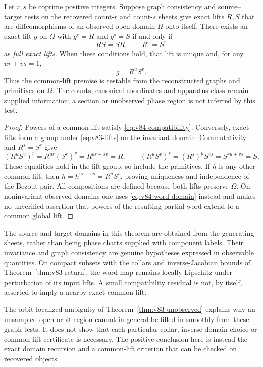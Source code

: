 \begin{theorem}
\label{thm:v84-compatible}
Let $r,s$ be coprime positive integers. Suppose graph consistency and
source--target tests on the recovered count-$r$ and count-$s$ sheets
give exact lifts $R,S$ that are diffeomorphisms of an observed open
domain $\Omega$ onto itself. There exists an exact lift $g$ on $\Omega$
with $g^r=R$ and $g^s=S$ if and only if
\begin{equation}\label{eq:v84-compatibility}
                         RS=SR,\qquad R^s=S^r
\end{equation}
as \emph{full exact lifts}. When these conditions hold, that lift is
unique and, for any $ur+vs=1$,
\[
                              g=R^uS^v.
\]
Thus the common-lift premise is testable from the reconstructed graphs
and primitives on $\Omega$. The counts, canonical coordinates and
apparatus class remain supplied information; a section or unobserved
phase region is not inferred by this test.
\end{theorem}
\begin{proof}
Powers of a common lift satisfy \eqref{eq:v84-compatibility}. Conversely,
exact lifts form a group under \eqref{eq:v83-lifts} on the invariant
domain. Commutativity and $R^s=S^r$ give
\[
 (R^uS^v)^r=R^{ur}(S^r)^v=R^{ur+sv}=R,
 \qquad
 (R^uS^v)^s=(R^s)^uS^{vs}=S^{ru+vs}=S.
\]
These equalities hold in the lift group, so include the primitives.
If $h$ is any other common lift, then
$h=h^{ur+vs}=R^uS^v$, proving uniqueness and independence of the
Bezout pair. All compositions are defined because both lifts preserve
$\Omega$. On noninvariant observed domains one uses
\eqref{eq:v84-word-domain} instead and makes no unverified assertion
that powers of the resulting partial word extend to a common global
lift.
\end{proof}
The source and target domains in this theorem are obtained from the
generating sheets, rather than being phase charts supplied with
component labels. Their invariance and graph consistency are genuine
hypotheses expressed in observable quantities. On compact subsets
with the collars and inverse-Jacobian bounds of
Theorem~\ref{thm:v83-return}, the word map remains locally Lipschitz
under perturbation of its input lifts. A small compatibility residual
is not, by itself, asserted to imply a nearby exact common lift.

The orbit-localized ambiguity of Theorem~\ref{thm:v83-unobserved}
explains why an unsampled open orbit region cannot in general be
filled in smoothly from these graph tests. It does not show that each
particular collar, inverse-domain choice or common-lift certificate is
necessary. The positive conclusion here is instead the exact domain
recursion and a common-lift criterion that can be checked on recovered
objects.

